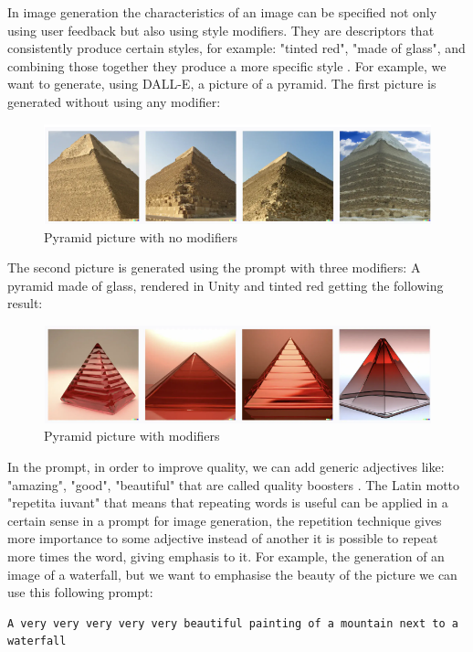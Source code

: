 In image generation the characteristics of an image can be specified not only using user feedback but also using style modifiers.
They are descriptors that consistently produce certain styles, for example: "tinted red", "made of glass", and combining those together they produce a more specific style \cite{lp_style}.
For example, we want to generate, using DALL-E, a picture of a pyramid.
The first picture is generated without using any modifier:
\begin{figure}[H]
    \centering
    \includegraphics[width=0.9\linewidth]{Figures/fig_11.png}
    \caption{Pyramid picture with no modifiers}
    \label{fig:11}
\end{figure}
The second picture is generated using the prompt with three modifiers: A pyramid made of glass, rendered in Unity and tinted red getting the following result:
\begin{figure}[H]
    \centering
    \includegraphics[width=0.9\linewidth]{Figures/fig_12.png}
    \caption{Pyramid picture with modifiers}
    \label{fig:12}
\end{figure}
In the prompt, in order to improve quality, we can add generic adjectives like: "amazing", "good", "beautiful" that are called quality boosters \cite{oppenlaender2023taxonomy}.
The Latin motto "repetita iuvant" that means that repeating words is useful can be applied in a certain sense in a prompt for image generation, the repetition technique gives more importance to some adjective instead of another it is possible to repeat more times the word, giving emphasis to it.
For example, the generation of an image of a waterfall, but we want to emphasise the beauty of the picture we can use this following prompt:
\begin{lstlisting}
A very very very very very beautiful painting of a mountain next to a waterfall
\end{lstlisting}
